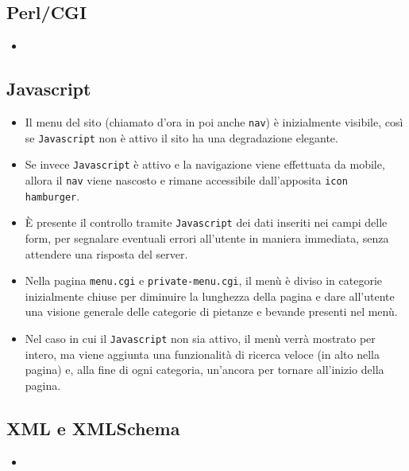 \documentclass[../relazione.tex]{subfiles}
\begin{document}
	\subsection{Perl/CGI}
	\begin{itemize}
		\item 
	\end{itemize}
	\subsection{Javascript}
	\begin{itemize}
		\item Il menu del sito (chiamato d'ora in poi anche \texttt{nav}) è inizialmente visibile, così se \texttt{Javascript} non è attivo il sito ha una degradazione elegante.
		\item Se invece \texttt{Javascript} è attivo e la navigazione viene effettuata da mobile, allora il \texttt{nav} viene nascosto e rimane accessibile dall'apposita \texttt{icon hamburger}.
		\item È presente il controllo tramite \texttt{Javascript} dei dati inseriti nei campi delle form, per segnalare eventuali errori all'utente in maniera immediata, senza attendere una risposta del server.
		\item Nella pagina \texttt{menu.cgi} e \texttt{private-menu.cgi}, il menù è diviso in categorie inizialmente chiuse per diminuire la lunghezza della pagina e dare all'utente una visione generale delle categorie di pietanze e bevande presenti nel menù.
		\item Nel caso in cui il \texttt{Javascript} non sia attivo, il menù verrà mostrato per intero, ma viene aggiunta una funzionalità di ricerca veloce (in alto nella pagina) e, alla fine di ogni categoria, un'ancora per tornare all'inizio della pagina.
	\end{itemize}
	\subsection{XML e XMLSchema}
	\begin{itemize}
		\item 
	\end{itemize}
\end{document}
